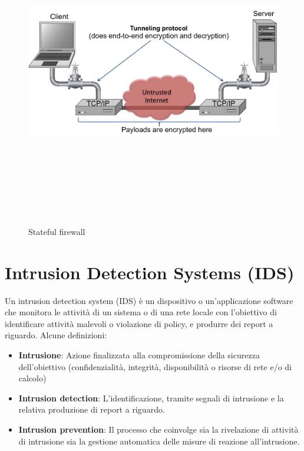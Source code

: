 \begin{figure}[htbp]
	\centering%
	\subfigure%
	{\includegraphics[height=13cm, width=13cm, keepaspectratio]{Immagini/firewalls/tunnel.png}}
	\caption{Stateful firewall \label{fig:tunnel}} 	
\end{figure}

\section{Intrusion Detection Systems (IDS)}
Un intrusion detection system (IDS) è un dispositivo o un'applicazione software che monitora le attività di un sistema o di una rete locale con l'obiettivo di identificare attività malevoli o violazione di policy, e produrre dei report a riguardo.
Alcune definizioni:
\begin{itemize}
\item \textbf{Intrusione}: Azione finalizzata alla compromissione della sicurezza dell'obiettivo (confidenzialità, integrità, disponibilità o risorse di rete e/o di calcolo)
\item \textbf{Intrusion detection}: L'identificazione, tramite segnali di intrusione e la relativa produzione di report a riguardo.
\item \textbf{Intrusion prevention}: Il processo che coinvolge sia la rivelazione di attività di intrusione sia la gestione automatica delle misure di reazione all'intrusione.
\end{itemize}

